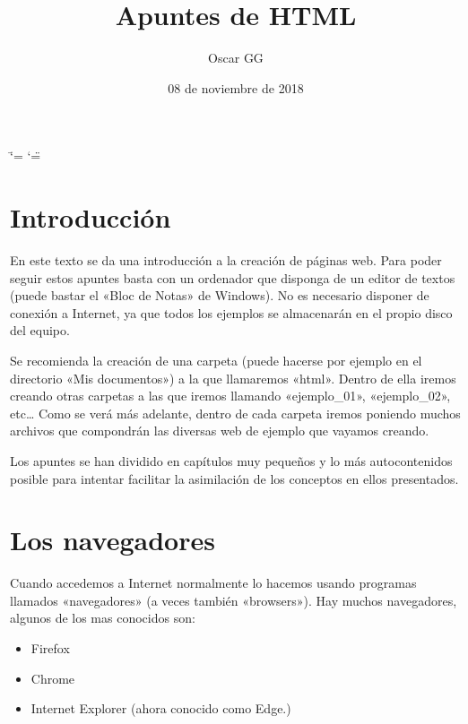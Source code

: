 \documentclass[a4paper,12pt,spanish]{sphinxmanual}
\title{Apuntes de HTML }
\date{08 de noviembre de 2018}
\author{Oscar GG}
\begin{document}
\ifdefined\shorthandoff
  \ifnum\catcode`\=\string=\active\shorthandoff{=}\fi
  \ifnum\catcode`\"=\active{}\fi
\fi

\pagestyle{empty}
\maketitle
\pagestyle{plain}
\sphinxtableofcontents
\pagestyle{normal}
\label{\detokenize{index::doc}}



\chapter{Introducción}
\label{\detokenize{index:introduccion}}
En este texto se da una introducción  a la creación de páginas web. Para poder seguir estos apuntes basta con un ordenador que disponga de un editor de textos (puede bastar el «Bloc de Notas» de Windows). No es necesario disponer de conexión a Internet, ya que todos los ejemplos se almacenarán en el propio disco del equipo.

Se recomienda la creación de una carpeta (puede hacerse por ejemplo en el directorio «Mis documentos») a la que llamaremos «html». Dentro de ella iremos creando otras carpetas a las que iremos llamando «ejemplo\_01», «ejemplo\_02», etc… Como se verá más adelante, dentro de cada carpeta iremos poniendo muchos archivos que compondrán las diversas web de ejemplo que vayamos creando.

Los apuntes se han dividido en capítulos muy pequeños y lo más autocontenidos posible para intentar facilitar la asimilación de los conceptos en ellos presentados.


\chapter{Los navegadores}
\label{\detokenize{index:los-navegadores}}
Cuando accedemos a Internet normalmente lo hacemos usando programas llamados «navegadores» (a veces también «browsers»). Hay muchos navegadores, algunos de los mas conocidos son:
\begin{itemize}
\item {} 
Firefox

\item {} 
Chrome

\item {} 
Internet Explorer (ahora conocido como Edge.)

\end{itemize}
\end{document}
